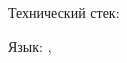 \documentclass[margin,line]{resume}
\begin{document}
\begin{resume}
\begin{description}
      Технический стек:
      \begin{list2}
      \item{Язык: , }
      \end{list2}
      \vspace{3mm}

  \end{description}
\end{resume}
\end{document}
